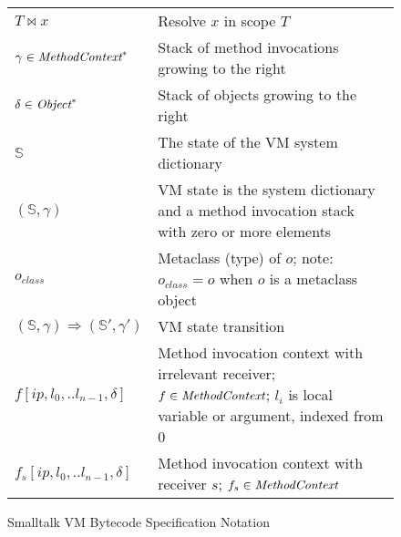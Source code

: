 \documentclass[11pt]{article}
\begin{document}
\begin{figure}
\begin{center}
\begin{tabular}{l p{8cm}}
$T \bowtie x$ & Resolve $x$ in scope $T$ \\
$\gamma \in \text{\it MethodContext}^*$ & Stack of method invocations growing to the right\\
$\delta \in \text{\it Object}^*$ & Stack of objects growing to the right\\

$\mathbb{S}$ & The state of the VM system dictionary\\

$(\mathbb{S},\gamma)$ & VM state is the system dictionary and a method invocation stack with zero or more elements\\

$o_{class}$ & Metaclass (type) of $o$; note: $o_{class}=o$ when $o$ is a metaclass object\\

$(\mathbb{S}, \gamma) \Rightarrow (\mathbb{S}', \gamma')$ & VM state transition\\
$f[ip,l_0,..l_{n-1},\delta]$ & Method invocation context with irrelevant receiver; $f \in \text{\it MethodContext}$; $l_i$ is local variable or argument, indexed from 0 \\
$f_s[ip,l_0,..l_{n-1},\delta]$ & Method invocation context with receiver $s$; $f_s \in \text{\it MethodContext}$\\
\end{tabular}
\end{center}
\vspace{-5pt}
\caption{\small Smalltalk VM Bytecode Specification Notation}
\vspace{-10pt}
\label{acfg}
\end{figure} 
\end{document}
